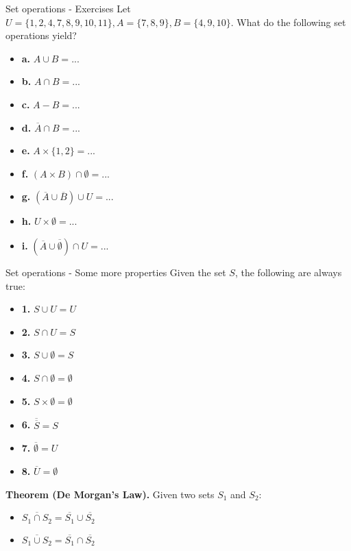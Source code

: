 \documentclass[10pt]{beamer}
\begin{document}
\begin{frame}{Set operations - Exercises}
    Let $U = \{1,2,4,7,8,9,10,11\}, A = \{7,8,9\}, B = \{4,9,10\}$. What do the following set operations yield?
    \begin{itemize}
        \item \textbf{a.} $A \cup B = ...$
        \item \textbf{b.} $A \cap B = ...$
        \item \textbf{c.} $A - B = ...$
        \item \textbf{d.} $\overline{A} \cap B = ...$
        \item \textbf{e.} $A \times \{1,2\} = ...$
        \item \textbf{f.} $ (A \times B) \cap \emptyset = ...$
        \item \textbf{g.} $ (\overline{A} \cup \overline{B}) \cup U = ...$
        \item \textbf{h.} $U \times \emptyset = ...$
        \item \textbf{i.} $ (\overline{A} \cup \overline{\emptyset}) \cap U = ...$
    \end{itemize}
\end{frame}

\begin{frame}{Set operations - Some more properties}
    Given the set $S$, the following are always true:
    \begin{itemize}
        \item \textbf{1.} $S \cup U = U$
        \item \textbf{2.} $S \cap U = S$
        \item \textbf{3.} $S \cup \emptyset = S$
        \item \textbf{4.} $S \cap \emptyset = \emptyset$
        \item \textbf{5.} $S \times \emptyset = \emptyset$
        \item \textbf{6.} $\overline{\overline{S}} = S$
        \item \textbf{7.} $\overline{\emptyset} = U$
        \item \textbf{8.} $\overline{U} = \emptyset$
    \end{itemize}
    \textbf{Theorem (De Morgan's Law).} Given two sets $S_1$ and $S_2$:
    \begin{itemize}
        \item $\overline{S_1 \cap S_2} = \overline{S_1} \cup \overline{S_2}$
        \item $\overline{S_1 \cup S_2} = \overline{S_1} \cap \overline{S_2}$
    \end{itemize}
\end{frame}
\end{document}
